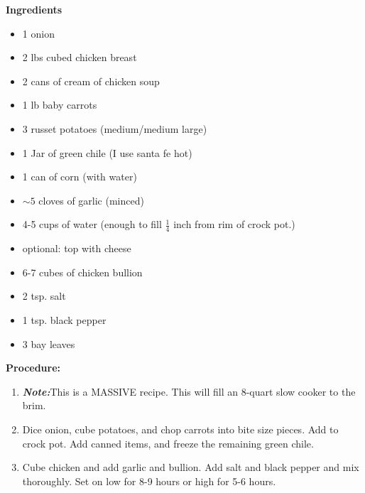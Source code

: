 \begin{multicols}{2}
\textbf{Ingredients}
\begin{itemize}
\item 1 onion 
\item 2 lbs cubed chicken breast
\item 2 cans of cream of chicken soup 
\item 1 lb baby carrots \quad 
\item 3 russet potatoes (medium/medium large)
\item 1 Jar of green chile (I use santa fe hot)
\item 1 can of corn (with water)
\item $\sim 5$ cloves of garlic (minced) 
\item 4-5 cups of water (enough to fill $\frac{1}{4}$ inch from rim of crock pot.)
\item optional: top with cheese 
\item 6-7 cubes of chicken bullion 
\item 2 tsp. salt
\item 1 tsp. black pepper
\item 3 bay leaves



\end{itemize}


\columnbreak
\textbf{Procedure:}
\medskip


\begin{enumerate}
\item \textbf{\textit{Note:}}This is a MASSIVE recipe. This will fill an 8-quart slow cooker to the brim. 
\item Dice onion, cube potatoes, and chop carrots into bite size pieces. Add to crock pot. Add canned items, and freeze the remaining green chile.  


\medskip
\item Cube chicken and add garlic and bullion. Add salt and black pepper and mix thoroughly. Set on low for 8-9 hours or high for 5-6 hours. 
  
\end{enumerate}
\end{multicols}



